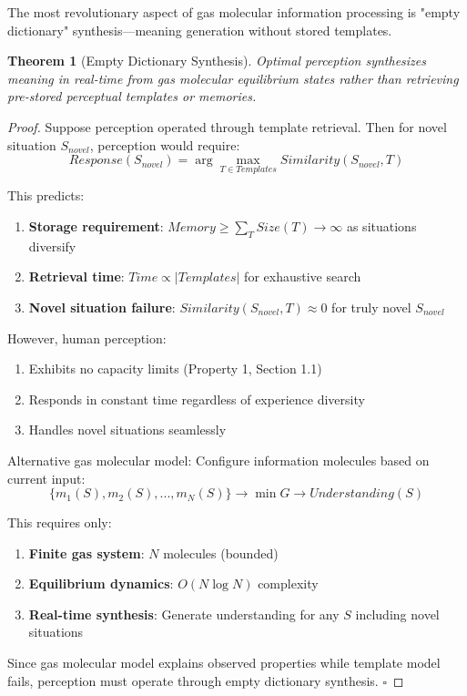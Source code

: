 \documentclass[12pt]{article}
\newtheorem{theorem}{Theorem}[section]
\theoremstyle{definition}
\theoremstyle{remark}
\begin{document}
The most revolutionary aspect of gas molecular information processing is "empty dictionary" synthesis—meaning generation without stored templates.

\begin{theorem}[Empty Dictionary Synthesis]
\label{thm:empty_dictionary}
Optimal perception synthesizes meaning in real-time from gas molecular equilibrium states rather than retrieving pre-stored perceptual templates or memories.
\end{theorem}

\begin{proof}
Suppose perception operated through template retrieval. Then for novel situation $S_{novel}$, perception would require:
\begin{equation}
Response(S_{novel}) = \arg\max_{T \in Templates} Similarity(S_{novel}, T)
\end{equation}

This predicts:
\begin{enumerate}
\item \textbf{Storage requirement}: $Memory \geq \sum_{T} Size(T) \rightarrow \infty$ as situations diversify
\item \textbf{Retrieval time}: $Time \propto |Templates|$ for exhaustive search
\item \textbf{Novel situation failure}: $Similarity(S_{novel}, T) \approx 0$ for truly novel $S_{novel}$
\end{enumerate}

However, human perception:
\begin{enumerate}
\item Exhibits no capacity limits (Property 1, Section 1.1)
\item Responds in constant time regardless of experience diversity
\item Handles novel situations seamlessly
\end{enumerate}

Alternative gas molecular model: Configure information molecules based on current input:
\begin{equation}
\{m_1(S), m_2(S), ..., m_N(S)\} \rightarrow \min G \rightarrow Understanding(S)
\end{equation}

This requires only:
\begin{enumerate}
\item \textbf{Finite gas system}: $N$ molecules (bounded)
\item \textbf{Equilibrium dynamics}: $O(N \log N)$ complexity
\item \textbf{Real-time synthesis}: Generate understanding for any $S$ including novel situations
\end{enumerate}

Since gas molecular model explains observed properties while template model fails, perception must operate through empty dictionary synthesis. $\square$
\end{proof}
\end{document}

